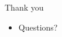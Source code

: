 \documentclass{beamer}
\begin{document}
\begin{frame}{Thank you}
	\begin{itemize}
		\setlength\itemsep{1em}
		\item Questions?
	\end{itemize}
\end{frame}


%
%  
\end{document}
